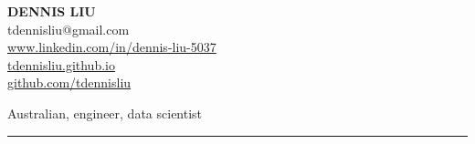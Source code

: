 \documentclass{article}
\newcommand{\HRule}{\rule{\linewidth}{0.5mm}}
\begin{document}
\begin{center} 

\textbf{\huge{DENNIS LIU}}
\\[0.5cm]

tdennisliu@gmail.com \\
\url{www.linkedin.com/in/dennis-liu-5037} \\
\url{tdennisliu.github.io}\\
\small{\url{github.com/tdennisliu}}

\end{center}
\begin{flushright}
Australian, engineer, data scientist 	
\end{flushright}



\HRule
\end{document}

